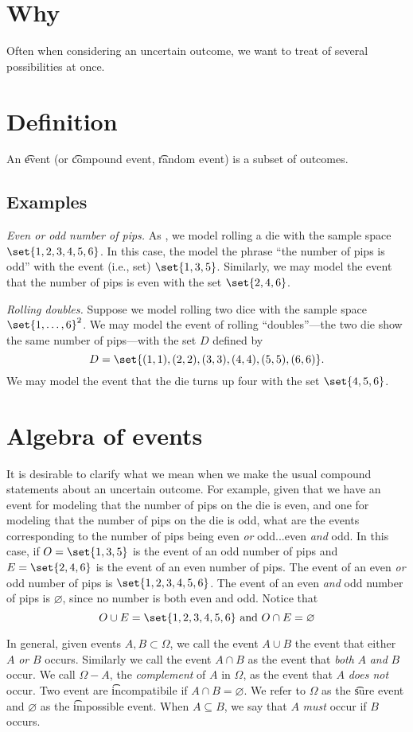 
\section*{Why}

Often when considering an uncertain outcome, we want to treat of several possibilities at once.

\section*{Definition}

An \t{event} (or \t{compound event}, \t{random event}) is a subset of outcomes.

\subsection*{Examples}

\textit{Even or odd number of pips.}
As , we model rolling a die with the sample space $\set{1, 2, 3, 4, 5, 6}$.
In this case, the model the phrase ``the number of pips is odd'' with the event (i.e., set) $\set{1, 3, 5}$.
Similarly, we may model the event that the number of pips is even with the set $\set{2, 4, 6}$.

\textit{Rolling doubles.}
Suppose we model rolling two dice with the sample space $\set{1,\dots ,6}^2$.
We may model the event of rolling ``doubles''---the two die show the same number of pips---with the set $D$ defined by
\[
D = \set{(1,1),(2,2),(3,3),(4,4),(5,5),(6,6)}.
\]
We may model the event that the die turns up four with the set $\set{4, 5, 6}$.

\section*{Algebra of events}

It is desirable to clarify what we mean when we make the usual compound statements about an uncertain outcome.
For example, given that we have an event for modeling that the number of pips on the die is even, and one for modeling that the number of pips on the die is odd, what are the events corresponding to the number of pips being even \textit{or} odd...even \textit{and} odd.
In this case, if $O = \set{1,3,5}$ is the event of an odd number of pips and $E = \set{2,4,6}$ is the event of an even number of pips.
The event of an even \textit{or} odd number of pips is $\set{1,2,3,4,5,6}$.
The event of an even \textit{and} odd number of pips is $\varnothing$, since no number is both even and odd.
Notice that
\[
O \cup E = \set{1,2,3,4,5,6} \text{ and } O \cap  E = \varnothing
\]

In general, given events $A, B \subset \Omega $, we call the event $A \cup B$ the event that either $A$ \textit{or} $B$ occurs.
Similarly we call the event $A \cap  B$ as the event that \textit{both} $A$ \textit{and} $B$ occur.
We call $\Omega  - A$, the \textit{complement} of $A$ in $\Omega $, as the event that $A$ \textit{does not} occur.
Two event are \t{incompatibile} if $A \cap  B = \varnothing$.
We refer to $\Omega $ as the \t{sure event} and $\varnothing$ as the \t{impossible event}.
When $A \subseteq B$, we say that $A$ \textit{must} occur if $B$ occurs.

\blankpage